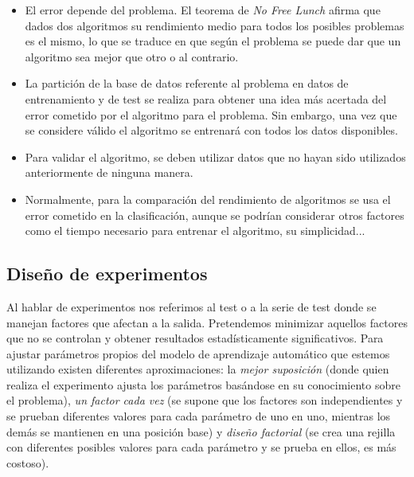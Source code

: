 	\begin{itemize}
	\item El error depende del problema. El teorema de 
		\textit{No Free Lunch} afirma que dados dos 
		algoritmos su rendimiento medio para todos los 
		posibles problemas es el mismo, lo que se traduce en 
		que según el problema se puede dar que un algoritmo 
		sea mejor que otro o al contrario.
	\item La partición de la base de datos referente al 
		problema en datos de entrenamiento y de test se 
		realiza para obtener una idea más acertada del error 
		cometido por el algoritmo para el problema. Sin 
		embargo, una vez que se considere válido el algoritmo 
		se entrenará con todos los datos disponibles.
	\item Para validar el algoritmo, se deben utilizar datos 
		que no hayan sido utilizados anteriormente de ninguna 
		manera.
	\item Normalmente, para la comparación del rendimiento de 
		algoritmos se usa el error cometido en la 
		clasificación, aunque se podrían considerar otros 
		factores como el tiempo necesario para entrenar el 
		algoritmo, su simplicidad...
	\end{itemize}
	
\subsection*{Diseño de experimentos}

	Al hablar de experimentos nos referimos al test o a la 
serie de test donde se manejan factores que afectan a la 
salida. Pretendemos minimizar aquellos factores que no se 
controlan y obtener resultados estadísticamente 
significativos. Para ajustar parámetros propios del modelo de 
aprendizaje automático que estemos utilizando existen 
diferentes aproximaciones: la \textit{mejor suposición} 
(donde quien realiza el experimento ajusta los parámetros 
basándose en su conocimiento sobre el problema), \textit{un 
factor cada vez} (se supone que los factores son 
independientes y se prueban diferentes valores para cada 
parámetro de uno en uno, mientras los demás se mantienen en 
una posición base) y \textit{diseño factorial} (se crea una 
rejilla con diferentes posibles valores para cada parámetro y 
se prueba en ellos, es más costoso).\\

